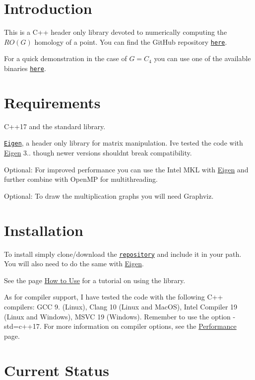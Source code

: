 \hypertarget{index_intro}{}\section{Introduction}\label{index_intro}
This is a C++ header only library devoted to numerically computing the $RO(G)$ homology of a point. You can find the Git\+Hub repository \href{https://github.com/NickG-Math/Mackey}{\tt here}.

For a quick demonstration in the case of $G=C_4$ you can use one of the available binaries \href{https://github.com/NickG-Math/Mackey/tree/master/bin}{\tt here}.\hypertarget{index_req}{}\section{Requirements}\label{index_req}

\begin{DoxyItemize}
\item C++17 and the standard library.
\item \href{ http://eigen.tuxfamily.org/index.php?title=Main_Page}{\tt Eigen}, a header only library for matrix manipulation. I\textquotesingle{}ve tested the code with \hyperlink{namespaceEigen}{Eigen} 3.. though newer versions shouldn\textquotesingle{}t break compatibility.
\item Optional\+: For improved performance you can use the Intel M\+KL with \hyperlink{namespaceEigen}{Eigen} and further combine with Open\+MP for multithreading.
\item Optional\+: To draw the multiplication graphs you will need Graphviz.
\end{DoxyItemize}\hypertarget{index_install}{}\section{Installation}\label{index_install}

\begin{DoxyItemize}
\item To install simply clone/download the \href{https://github.com/NickG-Math/Mackey}{\tt repository} and include it in your path. You will also need to do the same with \hyperlink{namespaceEigen}{Eigen}.
\item See the page \hyperlink{use}{How to Use} for a tutorial on using the library.
\item As for compiler support, I have tested the code with the following C++ compilers\+: G\+CC 9. (Linux), Clang 10 (Linux and Mac\+OS), Intel Compiler 19 (Linux and Windows), M\+S\+VC 19 (Windows). Remember to use the option {\ttfamily -\/std=c++17}. For more information on compiler options, see the \hyperlink{perf}{Performance} page.
\end{DoxyItemize}\hypertarget{index_status}{}\section{Current Status}\label{index_status}

